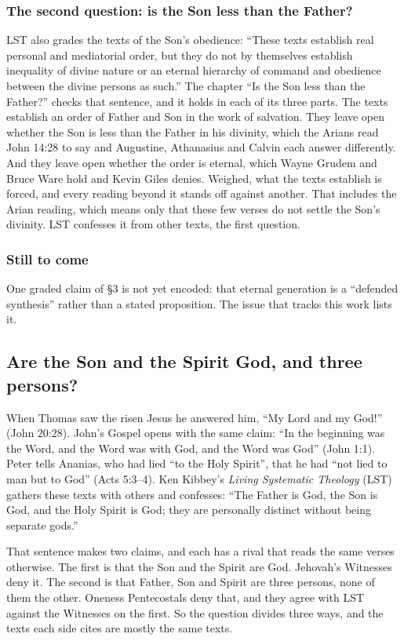 \documentclass[11pt,paper=\testimonypaper,DIV=13,parskip=false]{scrartcl}
\begin{document}
\subsubsection*{The second question: is the Son less than the Father?}
LST also grades the texts of the Son’s obedience: “These texts establish real personal and mediatorial order, but they do not by themselves establish inequality of divine nature or an eternal hierarchy of command and obedience between the divine persons as such.” The chapter “Is the Son less than the Father?” checks that sentence, and it holds in each of its three parts. The texts establish an order of Father and Son in the work of salvation. They leave open whether the Son is less than the Father in his divinity, which the Arians read John 14:28 to say and Augustine, Athanasius and Calvin each answer differently. And they leave open whether the order is eternal, which Wayne Grudem and Bruce Ware hold and Kevin Giles denies. Weighed, what the texts establish is forced, and every reading beyond it stands off against another. That includes the Arian reading, which means only that these few verses do not settle the Son’s divinity. LST confesses it from other texts, the first question.

\subsubsection*{Still to come}
One graded claim of §3 is not yet encoded: that eternal generation is a “defended synthesis” rather than a stated proposition. The issue that tracks this work lists it.

\subsection*{Are the Son and the Spirit God, and three persons?}
When Thomas saw the risen Jesus he answered him, “My Lord and my God!” (John 20:28). John’s Gospel opens with the same claim: “In the beginning was the Word, and the Word was with God, and the Word was God” (John 1:1). Peter tells Ananias, who had lied “to the Holy Spirit”, that he had “not lied to man but to God” (Acts 5:3–4). Ken Kibbey’s \emph{Living Systematic Theology} (LST) gathers these texts with others and confesses: “The Father is God, the Son is God, and the Holy Spirit is God; they are personally distinct without being separate gods.”

That sentence makes two claims, and each has a rival that reads the same verses otherwise. The first is that the Son and the Spirit are God. Jehovah’s Witnesses deny it. The second is that Father, Son and Spirit are three persons, none of them the other. Oneness Pentecostals deny that, and they agree with LST against the Witnesses on the first. So the question divides three ways, and the texts each side cites are mostly the same texts.
\end{document}
